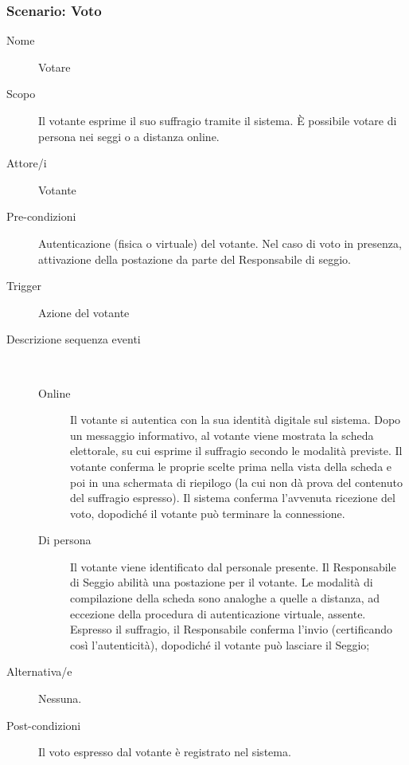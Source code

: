 \subsubsection{Scenario: Voto}
\begin{description}
	\item[Nome] Votare
	\item[Scopo] Il votante esprime il suo suffragio tramite il sistema. È possibile votare di persona nei seggi o a distanza online.
	\item[Attore/i] Votante
	\item[Pre-condizioni] Autenticazione (fisica o virtuale) del votante. Nel caso di voto in presenza, attivazione della postazione da parte del Responsabile di seggio.
	\item[Trigger] Azione del votante
	\item[Descrizione sequenza eventi] ~
		\begin{description}
			\item[Online] Il votante si autentica con la sua identità digitale sul sistema. Dopo un messaggio informativo, al votante viene mostrata la scheda elettorale, su cui esprime il suffragio secondo le modalità previste. Il votante conferma le proprie scelte prima nella vista della scheda e poi in una schermata di riepilogo (la cui non dà prova del contenuto del suffragio espresso). Il sistema conferma l'avvenuta ricezione del voto, dopodiché il votante può terminare la connessione.
			\item[Di persona] Il votante viene identificato dal personale presente. Il Responsabile di Seggio abilità una postazione per il votante. Le modalità di compilazione della scheda sono analoghe a quelle a distanza, ad eccezione della procedura di autenticazione virtuale, assente. Espresso il suffragio, il Responsabile conferma l'invio (certificando così l'autenticità), dopodiché il votante può lasciare il Seggio;
		\end{description}
	\item[Alternativa/e] Nessuna.
	\item[Post-condizioni] Il voto espresso dal votante è registrato nel sistema.
\end{description}

